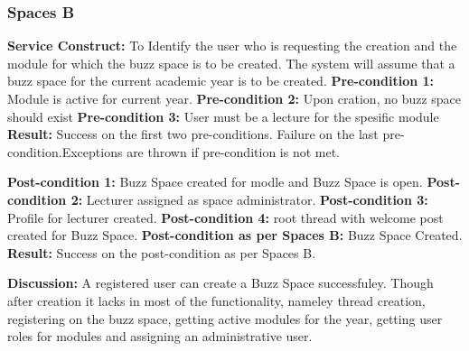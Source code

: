 \subsubsection{Spaces B}
\textbf{Service Construct:} To Identify the user who is requesting the creation and the module for which the buzz space is to be 		                                              created. The system will assume that a buzz space for the current academic year is to be created. 
				  \newline
\textbf{Pre-condition 1:}  Module is active for current year.  \newline
\textbf{Pre-condition 2:}  Upon cration, no buzz space should exist \newline
\textbf{Pre-condition 3:}  User must be a lecture for the spesific module \newline
\textbf{Result:} Success on the first two  pre-conditions. Failure on the last pre-condition.Exceptions are thrown if pre-condition is not met. \newline

\textbf{Post-condition 1:} Buzz Space created for modle and Buzz Space is open.\newline
\textbf{Post-condition 2:} Lecturer assigned as space administrator.\newline
\textbf{Post-condition 3:} Profile for lecturer created.\newline
\textbf{Post-condition 4:} root thread with welcome post created for Buzz Space.\newline
\textbf{Post-condition as per Spaces B:} Buzz Space Created.\newline
\textbf{Result:} Success on the post-condition as per Spaces B. \newline
  
\textbf{Discussion:} A registered user can create a Buzz Space successfuley. Though after creation it lacks in most of the functionality, nameley thread creation, registering on the buzz space, getting active modules for the year, getting user roles for modules and assigning an administrative user.

